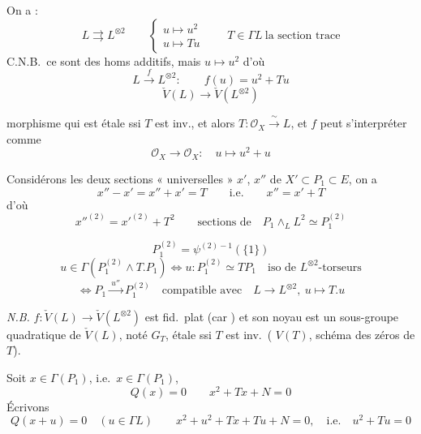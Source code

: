 \documentclass[11pt,a4paper]{article}
\begin{document}
On a :
\[
  L \rightrightarrows L^{\otimes 2} \qquad
  \left\{\begin{array}{l} u \longmapsto u^{2} \\ u \longmapsto Tu \end{array}\right.
  \qquad T \in \Gamma L \ \text{la section trace}
\]
C.N.B.\ ce sont des homs additifs, mais $u \mapsto u^{2}$  d'où
\[
  L \xrightarrow{\ f\ } L^{\otimes 2} : \qquad f(u) = u^{2} + Tu
\]
\[
  \check{V}(L) \longrightarrow \check{V}(L^{\otimes 2})
\]

morphisme qui est étale ssi $T$ est inv., et alors $T : \mathcal{O}_{X} \xrightarrow{\ \sim\ } L$, et $f$ peut s'interpréter comme
\[
  \mathcal{O}_{X} \to \mathcal{O}_{X} : \quad u \mapsto u^{2} + u
\]

Considérons  les deux sections « universelles » $x'$, $x''$ de $X' \subset P_{1} \subset E$, on a
\[
  x'' - x' = x'' + x' = T \qquad\text{i.e.}\qquad x'' = x' + T
\]
d'où
\[
  x''^{(2)} = x'^{(2)} + T^{2} \qquad\text{sections de}\quad P_{1} \wedge_{L} L^{2} \simeq P_{1}^{(2)}
\]


\[
  P_{1}^{(2)} = \psi^{(2)-1}(\{1\})
\]
\[
  u \in \Gamma(P_{1}^{(2)} \wedge T.P_{1}) \iff u : P_{1}^{(2)} \simeq T P_{1} \quad \text{iso de $L^{\otimes 2}$-torseurs}
\]
\[
  \iff P_{1} \xrightarrow{\ u''\ } P_{1}^{(2)} \quad \text{compatible avec}\quad L \to L^{\otimes 2},\ u \mapsto T.u
\]

\emph{N.B.} $f : \check{V}(L) \to \check{V}(L^{\otimes 2})$ est fid.\ plat (car \ill{}) et son noyau est un sous-groupe  quadratique de $\check{V}(L)$, noté $G_{T}$, étale ssi $T$ est inv.\ (\ill{} $V(T)$, schéma des zéros de $T$).

Soit $x \in \Gamma(P_{1})$, i.e.\ $x \in \Gamma(P_{1})$, 
\[
  Q(x) = 0 \qquad x^{2} + Tx + N = 0
\]
Écrivons
\[
  Q(x + u) = 0 \quad (u \in \Gamma L) \qquad x^{2} + u^{2} + Tx + Tu + N = 0, \quad\text{i.e.}\quad u^{2} + Tu = 0
\]
\end{document}
